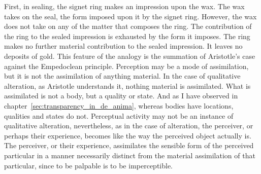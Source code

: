 First, in sealing, the signet ring makes an impression upon the wax. The wax takes on the seal, the form imposed upon it by the signet ring. However, the wax does not take on any of the matter that composes the ring.  The contribution of the ring to the sealed impression is exhausted by the form it imposes. The ring makes no further material contribution to the sealed impression. It leaves no deposits of gold. This feature of the analogy is the summation of Aristotle's case against the Empedoclean principle. Perception may be a mode of assimilation, but it is not the assimilation of anything material. In the case of qualitative alteration, as Aristotle understands it, nothing material is assimilated. What is assimilated is not a body, but a quality or state. And as I have observed in chapter~\ref{sec:transparency_in_de_anima}, whereas bodies have locations, qualities and states do not. Perceptual activity may not be an instance of qualitative alteration, nevertheless, as in the case of alteration, the perceiver, or perhaps their experience, becomes like the way the perceived object actually is. The perceiver, or their experience, assimilates the sensible form of the perceived particular in a manner necessarily distinct from the material assimilation of that particular, since to be palpable is to be imperceptible.

